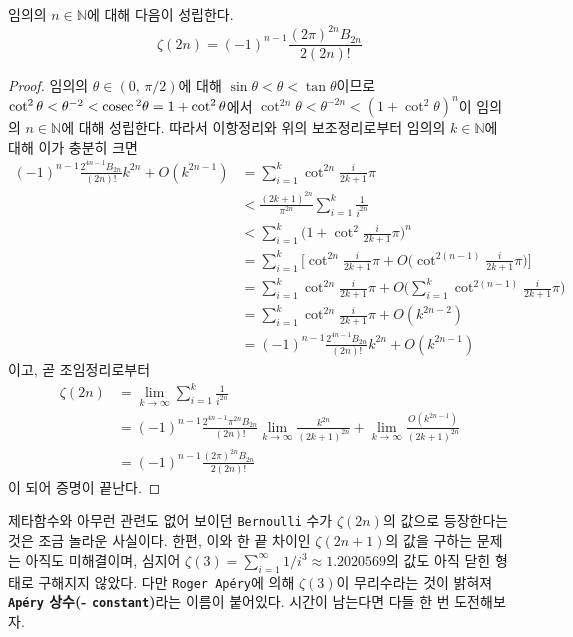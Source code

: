 \begin{theorem}
    임의의 $n\in\mathbb{N}$에 대해 다음이 성립한다.
    \begin{equation*}
        \zeta(2n)=(-1)^{n-1}\frac{(2\pi)^{2n}B_{2n}}{2(2n)!}
    \end{equation*}
\end{theorem}

\begin{proof}
    임의의 $\theta\in(0,\,\pi/2)$에 대해 $\sin\theta<\theta<\tan\theta$이므로 $\cot^2\theta<\theta^{-2}<\mathrm{cosec}\,^2\theta=1+\cot^2\theta$에서 $\cot^{2n}\theta<\theta^{-2n}<(1+\cot^2\theta)^n$이 임의의 $n\in\mathbb{N}$에 대해 성립한다. 따라서 이항정리와 위의 보조정리로부터 임의의 $k\in\mathbb{N}$에 대해 이가 충분히 크면
    \begin{align*}
        (-1)^{n-1}\frac{2^{4n-1}B_{2n}}{(2n)!}k^{2n}+O(k^{2n-1})&=\sum_{i=1}^k\cot^{2n}\frac{i}{2k+1}\pi\\
        &<\frac{(2k+1)^{2n}}{\pi^{2n}}\sum_{i=1}^k\frac{1}{i^{2n}}\\
        &<\sum_{i=1}^k\bigg(1+\cot^2\frac{i}{2k+1}\pi\bigg)^n\\
        &=\sum_{i=1}^k\bigg[\cot^{2n}\frac{i}{2k+1}\pi+O\bigg(\cot^{2(n-1)}\frac{i}{2k+1}\pi\bigg)\bigg]\\
        &=\sum_{i=1}^k\cot^{2n}\frac{i}{2k+1}\pi+O\bigg(\sum_{i=1}^k\cot^{2(n-1)}\frac{i}{2k+1}\pi\bigg)\\
        &=\sum_{i=1}^k\cot^{2n}\frac{i}{2k+1}\pi+O(k^{2n-2})\\
        &=(-1)^{n-1}\frac{2^{4n-1}B_{2n}}{(2n)!}k^{2n}+O(k^{2n-1})
    \end{align*}
    이고, 곧 조임정리로부터
    \begin{align*}
        \zeta(2n)&=\lim_{k\to\infty}\sum_{i=1}^k\frac{1}{i^{2n}}\\
        &=(-1)^{n-1}\frac{2^{4n-1}\pi^{2n}B_{2n}}{(2n)!}\lim_{k\to\infty}\frac{k^{2n}}{(2k+1)^{2n}}+\lim_{k\to\infty}\frac{O(k^{2n-1})}{(2k+1)^{2n}}\\
        &=(-1)^{n-1}\frac{(2\pi)^{2n}B_{2n}}{2(2n)!}
    \end{align*}
    이 되어 증명이 끝난다.
\end{proof}

제타함수와 아무런 관련도 없어 보이던 \texttt{Bernoulli} 수가 $\zeta(2n)$의 값으로 등장한다는 것은 조금 놀라운 사실이다. 한편, 이와 한 끝 차이인 $\zeta(2n+1)$의 값을 구하는 문제는 아직도 미해결이며, 심지어 $\zeta(3)=\sum_{i=1}^\infty1/i^3\approx1.2020569$의 값도 아직 닫힌 형태로 구해지지 않았다. 다만 \texttt{Roger Ap\'ery}에 의해 $\zeta(3)$이 무리수라는 것이 밝혀져 \textbf{\texttt{Ap\'ery} 상수(- \texttt{constant})}라는 이름이 붙어있다. 시간이 남는다면 다들 한 번 도전해보자.

